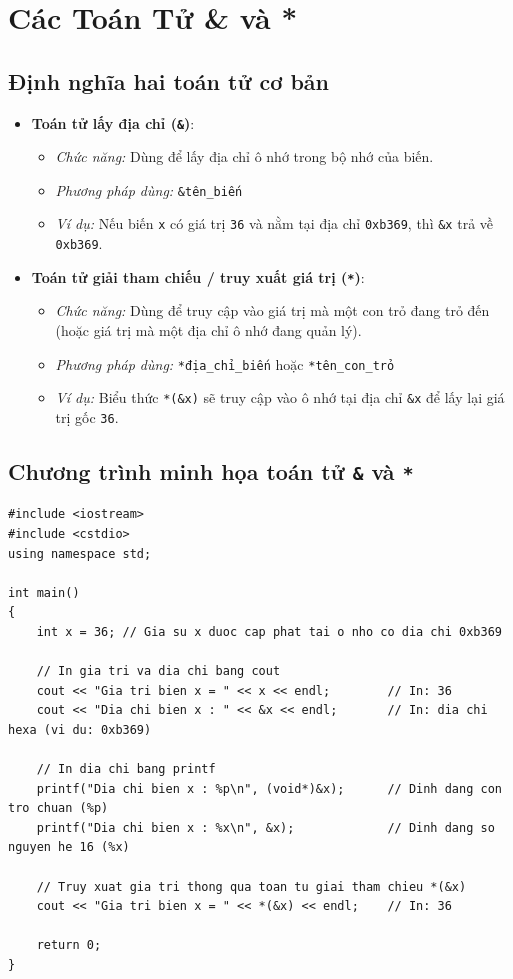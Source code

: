\documentclass[12pt,a4paper]{article}
\begin{document}
\section{Các Toán Tử \& và *}

\subsection{Định nghĩa hai toán tử cơ bản}
\begin{itemize}[itemsep=0.3em]
    \item \textbf{Toán tử lấy địa chỉ (\texttt{\&})}:
    \begin{itemize}
        \item \textit{Chức năng:} Dùng để lấy địa chỉ ô nhớ trong bộ nhớ của biến.
        \item \textit{Phương pháp dùng:} \texttt{\&tên\_biến}
        \item \textit{Ví dụ:} Nếu biến \texttt{x} có giá trị \texttt{36} và nằm tại địa chỉ \texttt{0xb369}, thì \texttt{\&x} trả về \texttt{0xb369}.
    \end{itemize}
    \item \textbf{Toán tử giải tham chiếu / truy xuất giá trị (\texttt{*})}:
    \begin{itemize}
        \item \textit{Chức năng:} Dùng để truy cập vào giá trị mà một con trỏ đang trỏ đến (hoặc giá trị mà một địa chỉ ô nhớ đang quản lý).
        \item \textit{Phương pháp dùng:} \texttt{*địa\_chỉ\_biến} hoặc \texttt{*tên\_con\_trỏ}
        \item \textit{Ví dụ:} Biểu thức \texttt{*(\&x)} sẽ truy cập vào ô nhớ tại địa chỉ \texttt{\&x} để lấy lại giá trị gốc \texttt{36}.
    \end{itemize}
\end{itemize}

\subsection{Chương trình minh họa toán tử \texttt{\&} và \texttt{*}}
\begin{lstlisting}
#include <iostream>
#include <cstdio>
using namespace std;

int main()
{
    int x = 36; // Gia su x duoc cap phat tai o nho co dia chi 0xb369

    // In gia tri va dia chi bang cout
    cout << "Gia tri bien x = " << x << endl;        // In: 36
    cout << "Dia chi bien x : " << &x << endl;       // In: dia chi hexa (vi du: 0xb369)

    // In dia chi bang printf
    printf("Dia chi bien x : %p\n", (void*)&x);      // Dinh dang con tro chuan (%p)
    printf("Dia chi bien x : %x\n", &x);             // Dinh dang so nguyen he 16 (%x)

    // Truy xuat gia tri thong qua toan tu giai tham chieu *(&x)
    cout << "Gia tri bien x = " << *(&x) << endl;    // In: 36

    return 0;
}
\end{lstlisting}
\end{document}
